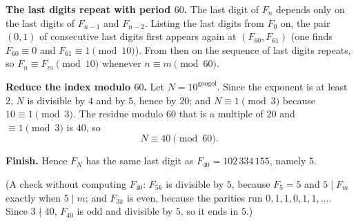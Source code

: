 \textbf{The last digits repeat with period $60$.} The last digit of $F_n$ depends only on the last digits of $F_{n-1}$ and $F_{n-2}$. Listing the last digits from $F_0$ on, the pair $(0,1)$ of consecutive last digits first appears again at $(F_{60},F_{61})$ (one finds $F_{60}\equiv0$ and $F_{61}\equiv1\pmod{10}$). From then on the sequence of last digits repeats, so $F_n\equiv F_m\pmod{10}$ whenever $n\equiv m\pmod{60}$.

\textbf{Reduce the index modulo $60$.} Let $N=10^{\text{googol}}$. Since the exponent is at least $2$, $N$ is divisible by $4$ and by $5$, hence by $20$; and $N\equiv1\pmod3$ because $10\equiv1\pmod3$. The residue modulo $60$ that is a multiple of $20$ and $\equiv1\pmod3$ is $40$, so
\[
N\equiv40\pmod{60}.
\]

\textbf{Finish.} Hence $F_N$ has the same last digit as $F_{40}=102\,334\,155$, namely $\boxed{5}$.

(A check without computing $F_{40}$: $F_{5k}$ is divisible by $5$, because $F_5=5$ and $5\mid F_m$ exactly when $5\mid m$; and $F_{3k}$ is even, because the parities run $0,1,1,0,1,1,\dots$. Since $3\nmid40$, $F_{40}$ is odd and divisible by $5$, so it ends in $5$.)
